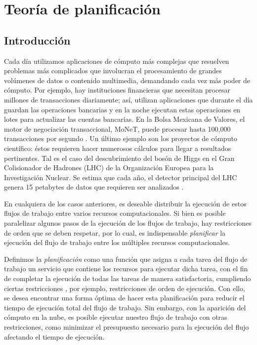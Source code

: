\chapter{Teoría de planificación}
\label{chap:scheduling_teory}

\section{Introducción}
\label{secc:intro}

Cada día utilizamos aplicaciones de cómputo más complejas que resuelven problemas más complicados que involucran el procesamiento de grandes volúmenes de datos o contenido multimedia, demandando cada vez más poder de cómputo. Por ejemplo, hay instituciones financieras que necesitan procesar millones de transacciones diariamente; así, utilizan aplicaciones que durante el día guardan las operaciones bancarias y en la noche ejecutan estas operaciones en lotes para actualizar las cuentas bancarias. En la Bolsa Mexicana de Valores, el motor de negociación transaccional, MoNeT, puede procesar hasta 100,000 transacciones por segundo \cite{bmv2012informe}. Un último ejemplo son los proyectos de cómputo científico: éstos requieren hacer numerosos cálculos para llegar a resultados pertinentes. Tal es el caso del descubrimiento del bosón de Higgs en el Gran Colisionador de Hadrones (LHC) de la Organización Europea para la Investigación Nuclear. Se estima que cada año, el detector principal del LHC genera 15 petabytes de datos que requieren ser analizados \cite{shiers2007worldwide}. %

En cualquiera de los casos anteriores, es deseable distribuir la ejecución de estos flujos de trabajo entre varios recursos computacionales. Si bien es posible paralelizar algunos pasos de la ejecución de los flujos de trabajo, hay restricciones de orden que se deben respetar, por lo cual, es indispensable \emph{planificar} la ejecución del flujo de trabajo entre los múltiples recursos computacionales.

Definimos la \emph{planificación} como una función que asigna a cada tarea del flujo de trabajo un servicio que contiene los recursos para ejecutar dicha tarea, con el fin de completar la ejecución de todas las tareas de manera satisfactoria, cumpliendo ciertas restricciones \cite{wieczorek2009towards}, por ejemplo, restricciones de orden de ejecución. Con ello, se desea encontrar una forma óptima de hacer esta planificación para reducir el tiempo de ejecución total del flujo de trabajo. Sin embargo, con la aparición del cómputo en la nube, es posible ejecutar nuestro flujo de trabajo con otras restricciones, como minimizar el presupuesto necesario para la ejecución del flujo afectando el tiempo de ejecución.

